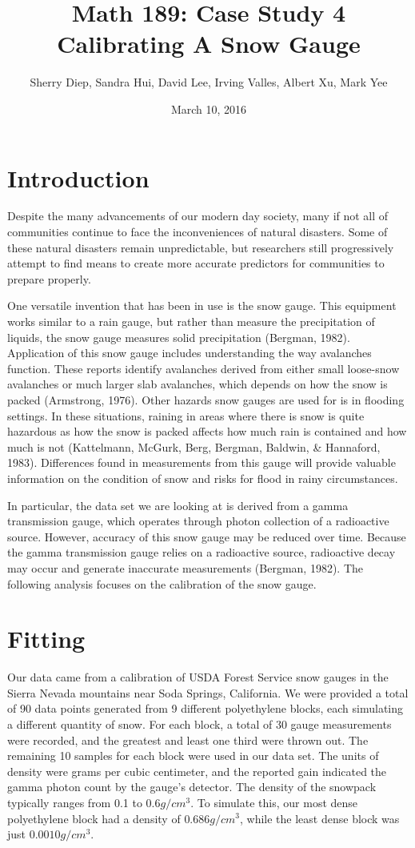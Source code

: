 \documentclass[11pt]{article} %
\title{\textbf{Math 189: Case Study 4}\\Calibrating A Snow Gauge}
\author{Sherry Diep, Sandra Hui, David Lee, Irving Valles, Albert Xu, Mark Yee}
\date{March 10, 2016}
\begin{document}
\maketitle

\section*{Introduction}
Despite the many advancements of our modern day society, many if not all of communities continue to face the inconveniences of natural disasters. Some of these natural disasters remain unpredictable, but researchers still progressively attempt to find means to create more accurate predictors for communities to prepare properly.

One versatile invention that has been in use is the snow gauge. This equipment works similar to a rain gauge, but rather than measure the precipitation of liquids, the snow gauge measures solid precipitation (Bergman, 1982). Application of this snow gauge includes understanding the way avalanches function. These reports identify avalanches derived from either small loose-snow avalanches or much larger slab avalanches, which depends on how the snow is packed (Armstrong, 1976). Other hazards snow gauges are used for is in flooding settings. In these situations, raining in areas where there is snow is quite hazardous as how the snow is packed affects how much rain is contained and how much is not (Kattelmann, McGurk, Berg, Bergman, Baldwin, \& Hannaford, 1983). Differences found in measurements from this gauge will provide valuable information on the condition of snow and risks for flood in rainy circumstances.

In particular, the data set we are looking at is derived from a gamma transmission gauge, which operates through photon collection of a radioactive source. However, accuracy of this snow gauge may be reduced over time. Because the gamma transmission gauge relies on a radioactive source, radioactive decay may occur and generate inaccurate measurements (Bergman, 1982). The following analysis focuses on the calibration of the snow gauge.

\section*{Fitting}
Our data came from a calibration of USDA Forest Service snow gauges in the Sierra Nevada mountains near Soda Springs, California. We were provided a total of 90 data points generated from 9 different polyethylene blocks, each simulating a different quantity of snow. For each block, a total of 30 gauge measurements were recorded, and the greatest and least one third were thrown out. The remaining 10 samples for each block were used in our data set. The units of density were grams per cubic centimeter, and the reported gain indicated the gamma photon count by the gauge’s detector. The density of the snowpack typically ranges from 0.1 to $0.6 g/cm^3$. To simulate this, our most dense polyethylene block had a density of $0.686 g/cm^3$, while the least dense block was just $0.0010 g/cm^3$.
\end{document}
